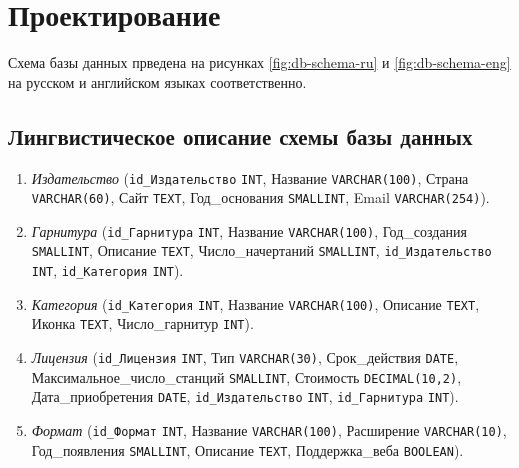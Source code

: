 \section{Проектирование}
Схема базы данных прведена на рисунках \ref{fig:db-schema-ru} и \ref{fig:db-schema-eng} на русском и английском языках соответственно.

\subsection{Лингвистическое описание схемы базы данных}

\begin{enumerate}
    \item \textit{Издательство} (\texttt{id_Издательство} \texttt{INT},
    Название \texttt{VARCHAR(100)},
    Страна \texttt{VARCHAR(60)},
    Сайт \texttt{TEXT},
    Год\_основания \texttt{SMALLINT},
    Email \texttt{VARCHAR(254)}).

    \item \textit{Гарнитура} (\texttt{id_Гарнитура} \texttt{INT},
    Название \texttt{VARCHAR(100)},
    Год\_создания \texttt{SMALLINT},
    Описание \texttt{TEXT},
    Число\_начертаний \texttt{SMALLINT},
    \texttt{id_Издательство} \texttt{INT},
    \texttt{id_Категория} \texttt{INT}).

    \item \textit{Категория} (\texttt{id_Категория} \texttt{INT},
    Название \texttt{VARCHAR(100)},
    Описание \texttt{TEXT},
    Иконка \texttt{TEXT},
    Число\_гарнитур \texttt{INT}).

    \item \textit{Лицензия} (\texttt{id_Лицензия} \texttt{INT},
    Тип \texttt{VARCHAR(30)},
    Срок\_действия \texttt{DATE},
    Максимальное\_число\_станций \texttt{SMALLINT},
    Стоимость \texttt{DECIMAL(10,2)},\newline
    Дата\_приобретения \texttt{DATE},
    \texttt{id_Издательство} \texttt{INT},
    \texttt{id_Гарнитура} \texttt{INT}).

    \item \textit{Формат} (\texttt{id_Формат} \texttt{INT},
    Название \texttt{VARCHAR(100)},
    Расширение \texttt{VARCHAR(10)},
    Год\_появления \texttt{SMALLINT},
    Описание \texttt{TEXT},
    Поддержка\_веба \texttt{BOOLEAN}).


\end{enumerate}
